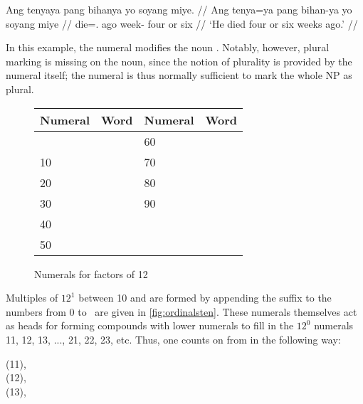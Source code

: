 \ex\label{ex:nummod}
\begingl
	\gla Ang tenyaya pang bihanya yo soyang miye. //
	\glb Ang tenya=ya pang bihan-ya yo soyang miye //
	\glc \AgtT{} die=\TsgM{}.\Top{} ago week-\Loc{} four or six //
	\glft `He died four or six weeks ago.' //
\endgl
\xe

In this example, the numeral  modifies the noun 
. Notably, however, plural marking is missing on the 
noun, since the notion of plurality is provided by the numeral itself; the 
numeral is thus normally sufficient to mark the whole NP as plural.

\begin{figure}[tp]\centering
\caption{Numerals for factors of 12}
\begin{tabu} to .75\linewidth {X[1c] X[2c] X[1c] X[2c]}
\toprule\tableheaderfont
Numeral
	& Word
	& Numeral
	& Word
	\\
\toprule

&
& 60 &  \\

10 & 
& 70 &  \\

20 &   
& 80 &  \\

30 & 
& 90 &  \\

40 & 
&  &  \\

50 & 
&  &  \\

\bottomrule
\end{tabu}
\label{fig:ordinalsten}
\end{figure}

Multiples of $12^1$ between 10 and  are formed by appending the 
suffix  to the numbers from 0 to \elv\ are given in 
\autoref{fig:ordinalsten}. These numerals themselves act as heads for forming 
compounds with lower numerals to fill in the $12^0$ numerals 11, 12, 13, ..., 
21, 22, 23, etc. Thus, one counts on from  in the 
following way:

\pex
\a %
	 (11), \\
	 (12), \\
	 (13),  \medskip
	
